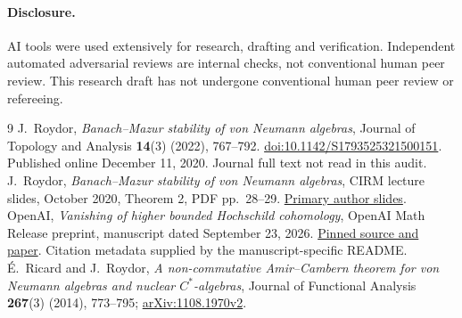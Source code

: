 \documentclass[11pt]{article}
\begin{document}
\paragraph{Disclosure.}
AI tools were used extensively for research, drafting and
verification. Independent automated adversarial reviews are internal
checks, not conventional human peer review. This research draft has
not undergone conventional human peer review or refereeing.

\begin{thebibliography}{9}
J.~Roydor, \emph{Banach--Mazur stability of von Neumann algebras},
Journal of Topology and Analysis \textbf{14}(3) (2022), 767--792.
\href{https://doi.org/10.1142/S1793525321500151}{doi:10.1142/S1793525321500151}.
Published online December 11, 2020. Journal full text not read in this audit.
J.~Roydor, \emph{Banach--Mazur stability of von Neumann algebras},
CIRM lecture slides, October 2020, Theorem 2, PDF pp.~28--29.
\href{https://www.cirm-math.fr/RepOrga/2169/Slides/Roydor_Slides.pdf}{Primary author slides}.
OpenAI, \emph{Vanishing of higher bounded Hochschild cohomology},
OpenAI Math Release preprint, manuscript dated September 23, 2026.
\href{https://github.com/openai/math/blob/adc7f1241b42e322a6451854ab7e4b4c146bf78a/preprints/Vanishing-of-higher-bounded-Hochschild-cohomology-September-23-2026/paper.pdf}{Pinned source and paper}.
Citation metadata supplied by the manuscript-specific README.
\'{E}.~Ricard and J.~Roydor, \emph{A non-commutative Amir--Cambern
theorem for von Neumann algebras and nuclear $C^*$-algebras},
Journal of Functional Analysis \textbf{267}(3) (2014), 773--795;
\href{https://arxiv.org/abs/1108.1970v2}{arXiv:1108.1970v2}.
\end{thebibliography}
\end{document}
